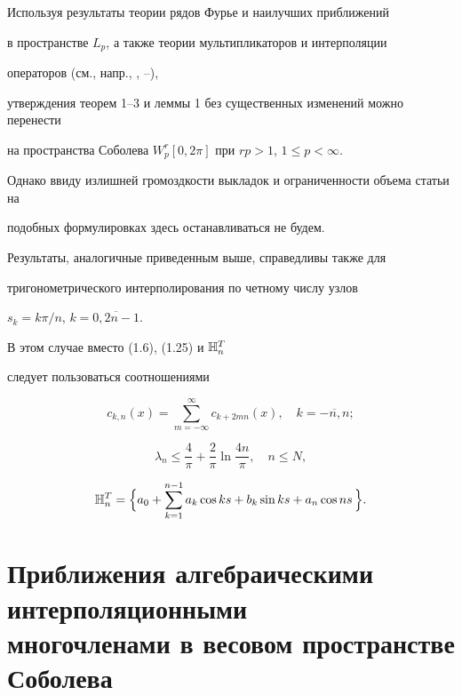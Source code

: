 \begin{note}


Используя результаты теории рядов Фурье и наилучших приближений


в пространстве $L_p$, а также теории мультипликаторов и интерполяции


операторов (см., напр., \cite{Zy}, \cite{Kant}--\cite{Ed2}),


утверждения теорем 1--3 и леммы 1 без существенных изменений можно перенести


на пространства Соболева $W_p^r[0,2\pi]$ при $rp>1$, $1\le p<\infty$.


Однако ввиду излишней громоздкости выкладок и ограниченности объема статьи на


подобных формулировках здесь останавливаться не будем.


\end{note}





\begin{note}


Результаты, аналогичные приведенным выше, справедливы также для


тригонометрического интерполирования по четному числу узлов


$s_k=k\pi /n$, $k=\overline{0,2n-1}$.


В этом случае вместо (1.6), (1.25) и $\Bbb{H}_n^T$


следует пользоваться соотношениями


$$


c_{k,n}(x)=\sum_{m=-\infty }^\infty c_{k+2mn}(x),\quad k=\overline{-n,n} ;


$$


%


$$


\lambda_n \le \frac{4}{\pi}+\frac{2}{\pi}\ln \frac{4n}{\pi},


\quad n \le N,


$$


%


$$


\Bbb{H}_n^T=\Bigl\{a_0 +\sum_{k=1}^{n-1}a_k\cos{ks} +


b_k\sin{ks} +a_n\cos{ns}\, \Bigr\} .


$$


\end{note}





\section{Приближения алгебраическими интерполяционными\protect\\


многочленами в весовом пространстве Соболева}





